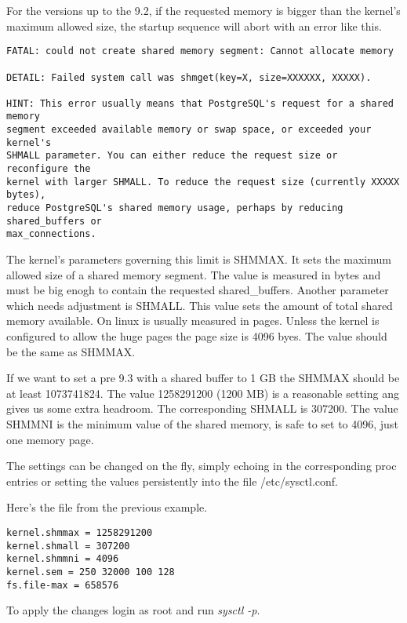 For the versions up to the 9.2, if the requested memory is bigger than the kernel's maximum
allowed size, the startup sequence will abort with an error like this.

\begin{verbatim}
FATAL: could not create shared memory segment: Cannot allocate memory

DETAIL: Failed system call was shmget(key=X, size=XXXXXX, XXXXX).

HINT: This error usually means that PostgreSQL's request for a shared memory
segment exceeded available memory or swap space, or exceeded your kernel's
SHMALL parameter. You can either reduce the request size or reconfigure the
kernel with larger SHMALL. To reduce the request size (currently XXXXX bytes),
reduce PostgreSQL's shared memory usage, perhaps by reducing shared_buffers or
max_connections.
\end{verbatim}

The kernel's parameters governing this limit is SHMMAX. It sets the maximum allowed size of a shared
memory segment. The value is measured in bytes and must be big enogh to contain the
requested shared\_buffers. Another parameter which needs adjustment is SHMALL. This value sets the
amount of total shared memory available. On linux is usually measured in pages. Unless the
kernel is configured to allow the huge pages the page size is 4096 byes. The value should be the
same as SHMMAX. \newline

If we want to set a pre 9.3 with a shared buffer to 1 GB the SHMMAX should be at least 1073741824.
The value 1258291200 (1200 MB) is a reasonable setting ang gives us some extra headroom. The
corresponding SHMALL is 307200. The value SHMMNI is the minimum value of the shared memory, is safe
to set to 4096, just one memory page. 

The settings can be changed on the fly, simply echoing in the corresponding proc entries or setting
the values persistently into the file /etc/sysctl.conf.

Here's the file from the previous example.
\begin{verbatim}
kernel.shmmax = 1258291200
kernel.shmall = 307200
kernel.shmmni = 4096
kernel.sem = 250 32000 100 128
fs.file-max = 658576
\end{verbatim}

To apply the changes login as root and run \textit{sysctl -p}.\newline


